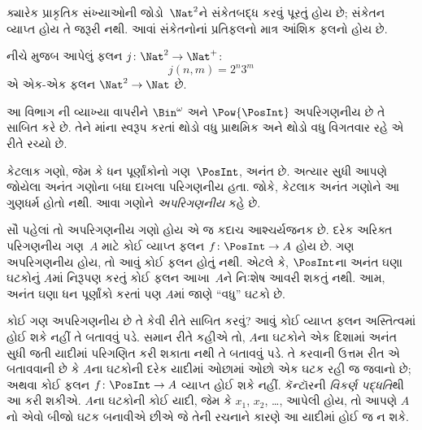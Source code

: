 ક્યારેક પ્રાકૃતિક સંખ્યાઓની જોડો~$\Nat^2$ને
સંકેતબદ્ધ કરવું પૂરતું હોય છે; સંકેતન વ્યાપ્ત હોય
તે જરૂરી નથી. આવાં સંકેતનોનાં પ્રતિફલનો
માત્ર આંશિક ફલનો હોય છે.

\begin{ex}
નીચે મુજબ આપેલું ફલન $j\colon \Nat^2 \to \Nat^+$:
\[
j(n,m) = 2^n3^m
\]
એ એક-એક ફલન $\Nat^2 \to \Nat$ છે.
\end{ex}
\endgroup


\begingroup
\makeatletter{}\makeatother


\label{guunit:OLP-0033}


\begin{editorial}
  આ વિભાગ ની વ્યાખ્યા વાપરીને
  $\Bin^\omega$ અને $\Pow{\PosInt}$ અપરિગણનીય છે તે સાબિત કરે છે.
  તેને માંના સ્વરૂપ કરતાં થોડો વધુ
  પ્રાથમિક અને થોડો વધુ વિગતવાર રહે એ રીતે રચ્યો છે.
\end{editorial}

કેટલાક ગણો, જેમ કે ધન પૂર્ણાંકોનો ગણ~$\PosInt$, અનંત છે.
અત્યાર સુધી આપણે જોયેલા અનંત ગણોના બધા દાખલા
પરિગણનીય હતા. જોકે, કેટલાક અનંત ગણોને આ ગુણધર્મ
હોતો નથી. આવા ગણોને \emph{અપરિગણનીય} કહે છે.

સૌ પહેલાં તો અપરિગણનીય ગણો હોય એ જ કદાચ આશ્ચર્યજનક છે.
દરેક અરિક્ત પરિગણનીય ગણ~$A$ માટે કોઈ વ્યાપ્ત ફલન
$f \colon \PosInt \to A$ હોય છે. ગણ અપરિગણનીય હોય,
તો આવું કોઈ ફલન હોતું નથી. એટલે કે, $\PosInt$ના અનંત ઘણા
ઘટકોનું $A$માં નિરૂપણ કરતું કોઈ ફલન આખા~$A$ને
નિઃશેષ આવરી શકતું નથી. આમ, અનંત ઘણા ધન પૂર્ણાંકો કરતાં પણ
$A$માં જાણે ``વધુ'' ઘટકો છે.

કોઈ ગણ અપરિગણનીય છે તે કેવી રીતે સાબિત કરવું?
આવું કોઈ વ્યાપ્ત ફલન અસ્તિત્વમાં હોઈ શકે નહીં તે બતાવવું પડે.
સમાન રીતે કહીએ તો, $A$ના ઘટકોને એક દિશામાં અનંત સુધી જતી
યાદીમાં પરિગણિત કરી શકાતા નથી તે બતાવવું પડે. તે કરવાની ઉત્તમ
રીત એ બતાવવાની છે કે $A$ના ઘટકોની દરેક યાદીમાં ઓછામાં
ઓછો એક ઘટક રહી જ જવાનો છે; અથવા કોઈ ફલન
$f\colon \PosInt \to A$ વ્યાપ્ત હોઈ શકે નહીં. કૅન્ટૉરની
\emph{વિકર્ણ પદ્ધતિ}થી આ કરી શકીએ. $A$ના ઘટકોની કોઈ
યાદી, જેમ કે $x_1$, $x_2$, \dots, આપેલી હોય, તો આપણે $A$નો
એવો બીજો ઘટક બનાવીએ છીએ જે તેની રચનાને કારણે આ યાદીમાં હોઈ જ ન શકે.

